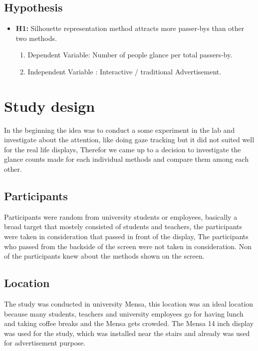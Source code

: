 \subsection{Hypothesis}

\begin{itemize}
\item \textbf{H1:} Silhouette representation method attracts more passer-bys than other two methods.
    \begin{enumerate}
        \item Dependent Variable: Number of people glance per total passers-by.
        \item Independent Variable : Interactive / traditional Advertisement.
    \end{enumerate}       
\end{itemize}



\section{Study design}

In the beginning the idea was to conduct a some experiment in the lab and investigate about the attention, like doing gaze tracking but it did not suited well for the real life displays, Therefor we came up to a decision to investigate the glance counts made for each individual methods and compare them among each other. 

\subsection{Participants}
Participants were random from university students or employees, basically a broad target that mostely consisted of students and teachers, the participants were taken in consideration that passed in front of the display, The participants who passed from the backside of the screen were not taken in consideration. Non of the participants knew about the methods shown on the screen.

\subsection{Location}
The study was conducted in university Mensa, this location was an ideal location because many students, teachers and university employees go for having lunch and taking coffee breaks and the Mensa gets crowded. The Mensa 14 inch display was used for the study, which was installed near the stairs and already was used for advertisement purpose.

